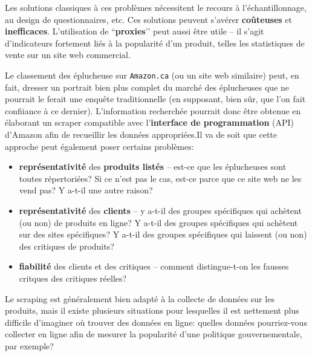 Les solutions classiques à ces problèmes nécessitent le recours à l'échantillonnage, au design de questionnaires, %
etc. Ces solutions peuvent s’avérer  \textbf{coûteuses} et \textbf{inefficaces}. L’utilisation de ``\textbf{proxies}'’ peut aussi être utile -- il s’agit d'indicateurs fortement liés à la popularité d'un produit, telles les statistiques de vente sur un site web commercial. 
\par Le classement des éplucheuse sur \texttt{Amazon.ca} (ou un site web similaire) peut, en fait, dresser un portrait bien plus complet du marché des éplucheuses que ne pourrait le ferait une enquête traditionnelle (en supposant, bien sûr, que l’on fait confiiance à ce dernier). L’information recherchée pourrait donc être obtenue en élaborant un scraper compatible avec l'\textbf{interface de programmation} (API) d'Amazon afin de  recueillir les données appropriées.\newl Il va de soit que cette approche peut également poser certains problèmes: 
\begin{itemize}[noitemsep]
\item \textbf{représentativité} des \textbf{produits listés} -- est-ce que les éplucheuses sont toutes répertoriées? Si ce n'est pas le cas, est-ce parce que ce site web ne les vend pas? Y a-t-il une autre raison?
\item \textbf{représentativité} des \textbf{clients} -- y a-t-il des groupes spécifiques qui achètent (ou non) de produits en ligne? Y a-t-il des groupes spécifiques qui achètent sur des sites spécifiques? Y a-t-il des groupes spécifiques qui laissent (ou non) des critiques de produits? 
\item \textbf{fiabilité} des clients et des critiques -- comment dis\-tin\-gue-t-on les fausses critques des critiques réelles?
\end{itemize}
Le scraping est généralement bien adapté à la collecte de données sur les produits, mais il existe plusieurs situations pour lesquelles il est nettement plus difficile d'imaginer où trouver des données en ligne: quelles données pourriez-vous collecter en ligne afin de mesurer la popularité d'une politique gouvernementale, par exemple? 
